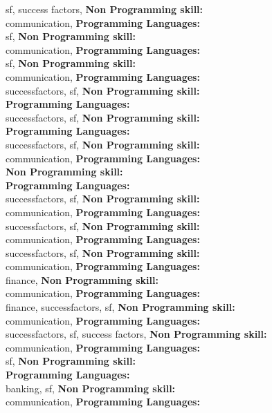 sf, success factors, \textbf{Non Programming skill:} \\
communication, \textbf{Programming Languages:} \\
sf, \textbf{Non Programming skill:} \\
communication, \textbf{Programming Languages:} \\
sf, \textbf{Non Programming skill:} \\
communication, \textbf{Programming Languages:} \\
successfactors, sf, \textbf{Non Programming skill:} \\
\textbf{Programming Languages:} \\
successfactors, sf, \textbf{Non Programming skill:} \\
\textbf{Programming Languages:} \\
successfactors, sf, \textbf{Non Programming skill:} \\
communication, \textbf{Programming Languages:} \\
\textbf{Non Programming skill:} \\
\textbf{Programming Languages:} \\
successfactors, sf, \textbf{Non Programming skill:} \\
communication, \textbf{Programming Languages:} \\
successfactors, sf, \textbf{Non Programming skill:} \\
communication, \textbf{Programming Languages:} \\
successfactors, sf, \textbf{Non Programming skill:} \\
communication, \textbf{Programming Languages:} \\
finance, \textbf{Non Programming skill:} \\
communication, \textbf{Programming Languages:} \\
finance, successfactors, sf, \textbf{Non Programming skill:} \\
communication, \textbf{Programming Languages:} \\
successfactors, sf, success factors, \textbf{Non Programming skill:} \\
communication, \textbf{Programming Languages:} \\
sf, \textbf{Non Programming skill:} \\
\textbf{Programming Languages:} \\
banking, sf, \textbf{Non Programming skill:} \\
communication, \textbf{Programming Languages:} \\
